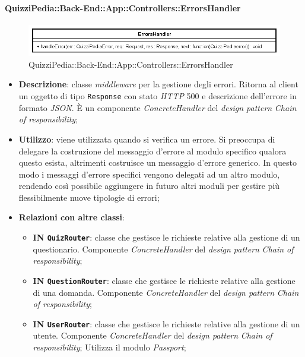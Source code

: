 \paragraph{QuizziPedia::Back-End::App::Controllers::ErrorsHandler}
\begin{figure}[ht]
	\centering
	\includegraphics[scale=0.6]{UML/Classi/Back-End/QuizziPedia_Back-End_App_Controllers_ErrorsHandler.png}
	\caption{QuizziPedia::Back-End::App::Controllers::ErrorsHandler}
\end{figure}
\FloatBarrier


\begin{itemize}
	\item \textbf{Descrizione}:
	classe \textit{middleware} per la gestione degli errori. Ritorna al client un oggetto di tipo \texttt{Response} con stato \textit{HTTP} 500 e descrizione dell'errore in formato \textit{JSON}. È un componente \textit{ConcreteHandler} del \textit{design pattern} \textit{Chain of responsibility};
	\item \textbf{Utilizzo}:
	viene utilizzata quando si verifica un errore. Si preoccupa di delegare la costruzione del messaggio d'errore al modulo specifico qualora questo esista, altrimenti costruisce un messaggio d'errore generico. In questo modo i messaggi d'errore specifici vengono delegati ad un altro modulo, rendendo così possibile aggiungere in futuro altri moduli per gestire più flessibilmente nuove tipologie di errori;
	\item \textbf{Relazioni con altre classi}:
	\begin{itemize}
		\item \textbf{IN \texttt{QuizRouter}}:
		classe che gestisce le richieste relative alla gestione di un questionario. Componente \textit{ConcreteHandler} del \textit{design pattern} \textit{Chain of responsibility};
		\item \textbf{IN \texttt{QuestionRouter}}:
		classe che gestisce le richieste relative alla gestione di una domanda. Componente \textit{ConcreteHandler} del \textit{design pattern} \textit{Chain of responsibility};
		\item \textbf{IN \texttt{UserRouter}}:
		classe che gestisce le richieste relative alla gestione di un utente. Componente \textit{ConcreteHandler} del \textit{design pattern} \textit{Chain of responsibility}; Utilizza il modulo \textit{Passport};

\end{itemize}
\end{itemize}
